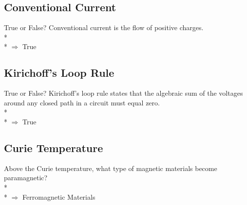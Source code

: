 \documentclass[11pt]{article}
\begin{document}
\subsection{Conventional Current}
True or False?  Conventional current is the flow of positive charges. \\* \\*
$\Rightarrow$ True

\subsection{Kirichoff's Loop Rule}
True or False?  Kirichoff's loop rule states that the algebraic sum of the voltages around any closed path in a circuit must equal zero. \\* \\*
$\Rightarrow$ True

\subsection{Curie Temperature}
Above the Curie temperature, what type of magnetic materials become paramagnetic? \\* \\*
$\Rightarrow$ Ferromagnetic Materials

\end{document}
